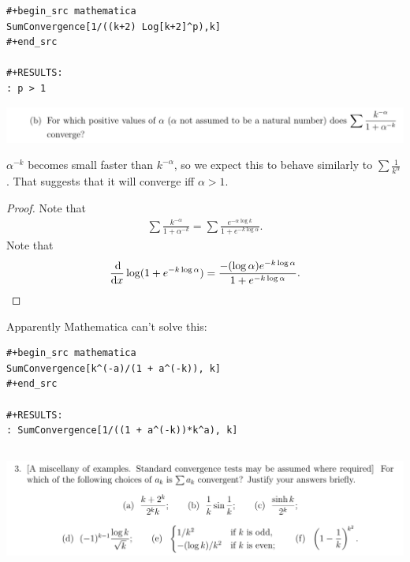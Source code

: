 \documentclass[12pt]{article}
\begin{document}
\begin{verbatim}
#+begin_src mathematica
SumConvergence[1/((k+2) Log[k+2]^p),k]
#+end_src

#+RESULTS:
: p > 1

\end{verbatim}

\newpage
\begin{mdframed}
\includegraphics[width=400pt]{img/analysis--oxford-M2-I-6-2-b.png}
\end{mdframed}

\begin{remark*}
  $\alpha^{-k}$ becomes small faster than $k^{-\alpha}$, so we expect this to behave similarly to
  $\sum \frac{1}{k^\alpha}$. That suggests that it will converge iff $\alpha > 1$.
\end{remark*}

\begin{proof}
  Note that
  \begin{align*}
    \sum \frac{k^{-\alpha}}{1 + \alpha^{-k}} =
    \sum \frac{e^{-\alpha \log k}}{1 + e^{-k \log \alpha}}.
  \end{align*}
  Note that
  \begin{align*}
    \ddx \log(1 + e^{-k \log \alpha}) =
    \frac{-(\log\alpha) e^{-k\log\alpha}}{1 + e^{-k \log \alpha}}.
  \end{align*}
\end{proof}

Apparently Mathematica can't solve this:

\begin{verbatim}
#+begin_src mathematica
SumConvergence[k^(-a)/(1 + a^(-k)), k]
#+end_src

#+RESULTS:
: SumConvergence[1/((1 + a^(-k))*k^a), k]
\end{verbatim}


\newpage
\subsection{}
\begin{mdframed}
  \includegraphics[width=400pt]{img/analysis--oxford-M2-I-6-3.png}
\end{mdframed}
\end{document}

